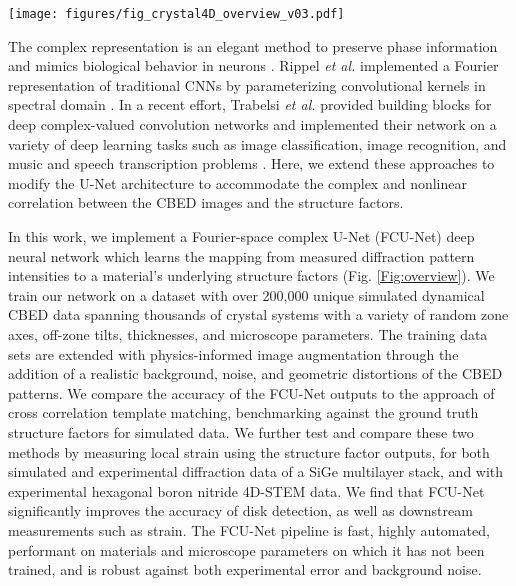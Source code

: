 \documentclass[%
 reprint,
superscriptaddress,
 amsmath,
 amssymb,
 prl,
]{revtex4-2}
\begin{document}
\begin{figure*}[htbp]
    \texttt{[image: figures/fig\_crystal4D\_overview\_v03.pdf]}
    \caption{{\bf Overview of the methods used in this paper.} (a) Multislice diffraction simulations of many samples with different crystal structures, compositions, orientations, and thicknesses, using various microscope parameters. (b) Augmentation of the simulated images by applying elliptic distortion, pattern shift, limited signal-to-noise, and background functions. (c) Deep learning training. (d) Experimental geometry for diffraction pattern measurements. (e) Dataset preprocessing. (f) Inversion of experimental diffraction images to predict the structure factors using the FCU-Net trained in (c).}
    \centering
    \label{Fig:overview}
\end{figure*}


The complex representation is an elegant method to preserve phase information and mimics biological behavior in neurons \cite{shi2006importance}. Rippel \textit{et al.} implemented a Fourier representation of traditional CNNs  by parameterizing convolutional kernels in spectral domain  \cite{rippel2015spectral}. %
In a recent effort, Trabelsi \textit{et al.} provided building blocks for deep complex-valued convolution networks and implemented their network on a variety of deep learning tasks such as image classification, image recognition, and music and speech transcription problems \cite{trabelsi2017deep}. Here, we extend these approaches to modify the U-Net architecture to accommodate the complex and nonlinear correlation between the CBED images and the structure factors.

In this work, we implement a Fourier-space complex U-Net (FCU-Net) deep neural network which learns the mapping from measured diffraction pattern intensities to a material's underlying structure factors (Fig. \ref{Fig:overview}). We train our network on a dataset with over 200,000 unique simulated dynamical CBED data spanning thousands of crystal systems with a variety of random zone axes, off-zone tilts, thicknesses, and microscope parameters.  The training data sets are extended with physics-informed image augmentation through the addition of a realistic background, noise, and geometric distortions of the CBED patterns.  We compare the accuracy of the FCU-Net outputs to the approach of cross correlation template matching, benchmarking against the ground truth structure factors for simulated data. We further test and compare these two methods by measuring local strain using the structure factor outputs, for both simulated and experimental diffraction data of a SiGe multilayer stack, and with experimental hexagonal boron nitride 4D-STEM data. We find that FCU-Net significantly improves the accuracy of disk detection, as well as downstream measurements such as strain.  The FCU-Net pipeline is fast, highly automated, performant on materials and microscope parameters on which it has not been trained, and is robust against both experimental error and background noise.
\end{document}
